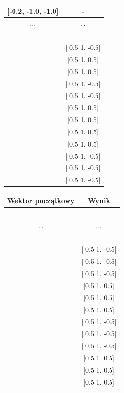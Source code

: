\documentclass{article}
\begin{document}
\begin{table}[H]
\begin{tabular}{|c|c|}
[-0.2, -1.0, -1.0] & - \\ \hline
... & ... \\ \hline
[-0.2, 0.2, 1.0] & - \\ \hline
[-0.2, 0.6, -1.0] & [ 0.5  1.  -0.5] \\ \hline
[-0.2, 0.6, -0.6] & [0.5 1.  0.5] \\ \hline
[-0.2, 0.6, -0.2] & [0.5 1.  0.5] \\ \hline
[-0.2, 0.6, 0.2] & [ 0.5  1.  -0.5] \\ \hline
[-0.2, 0.6, 0.6] & [ 0.5  1.  -0.5] \\ \hline
[-0.2, 0.6, 1.0] & [0.5 1.  0.5] \\ \hline
[-0.2, 1.0, -1.0] & [0.5 1.  0.5] \\ \hline
[-0.2, 1.0, -0.6] & [0.5 1.  0.5] \\ \hline
[-0.2, 1.0, -0.2] & [0.5 1.  0.5] \\ \hline
[-0.2, 1.0, 0.2] & [ 0.5  1.  -0.5] \\ \hline
[-0.2, 1.0, 0.6] & [ 0.5  1.  -0.5] \\ \hline
[-0.2, 1.0, 1.0] & [ 0.5  1.  -0.5] \\ \hline
\end{tabular}
\quad
\begin{tabular}{|c|c|}
\hline
Wektor początkowy & Wynik \\ \hline
[0.2, -1.0, -1.0] & - \\ \hline
... & ... \\ \hline
[0.2, 0.2, 1.0] & - \\ \hline
[0.2, 0.6, -1.0] & [ 0.5  1.  -0.5] \\ \hline
[0.2, 0.6, -0.6] & [ 0.5  1.  -0.5] \\ \hline
[0.2, 0.6, -0.2] & [ 0.5  1.  -0.5] \\ \hline
[0.2, 0.6, 0.2] & [0.5 1.  0.5] \\ \hline
[0.2, 0.6, 0.6] & [0.5 1.  0.5] \\ \hline
[0.2, 0.6, 1.0] & [0.5 1.  0.5] \\ \hline
[0.2, 1.0, -1.0] & [ 0.5  1.  -0.5] \\ \hline
[0.2, 1.0, -0.6] & [ 0.5  1.  -0.5] \\ \hline
[0.2, 1.0, -0.2] & [ 0.5  1.  -0.5] \\ \hline
[0.2, 1.0, 0.2] & [0.5 1.  0.5] \\ \hline
[0.2, 1.0, 0.6] & [0.5 1.  0.5] \\ \hline
[0.2, 1.0, 1.0] & [0.5 1.  0.5] \\ \hline

\end{tabular}
\end{table}
\end{document}
